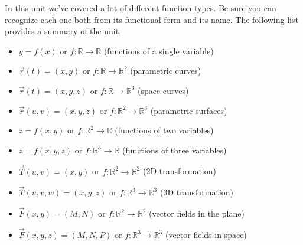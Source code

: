 In this unit we've covered a lot of different function types. Be sure you can recognize each one both from its functional form and its name. The following list provides a summary of the unit.
\begin{itemize}
	\item $y=f(x)$ or $f\colon \mathbb{R}\to\mathbb{R}$ (functions of a single variable)
	\item $\vec r(t)=(x,y)$ or $f\colon \mathbb{R}\to\mathbb{R}^2$ (parametric curves)
	\item $\vec r(t)=(x,y,z)$ or $f\colon \mathbb{R}\to\mathbb{R}^3$ (space curves)
	\item $\vec r(u,v)=(x,y,z)$ or $f\colon \mathbb{R}^2\to\mathbb{R}^3$ (parametric surfaces)
	\item $z=f(x,y)$ or $f\colon \mathbb{R}^2\to\mathbb{R}$ (functions of two variables)
	\item $z=f(x,y,z)$ or $f\colon \mathbb{R}^3\to\mathbb{R}$ (functions of three variables)
	\item $\vec T(u,v)=(x,y)$ or $f\colon \mathbb{R}^2\to\mathbb{R}^2$ (2D transformation)
	\item $\vec T(u,v,w)=(x,y,z)$ or $f\colon \mathbb{R}^3\to\mathbb{R}^3$ (3D transformation)
	\item $\vec F(x,y)=(M,N)$ or $f\colon \mathbb{R}^2\to\mathbb{R}^2$ (vector fields in the plane)
	\item $\vec F(x,y,z)=(M,N,P)$ or $f\colon \mathbb{R}^3\to\mathbb{R}^3$ (vector fields in space) 
\end{itemize}


